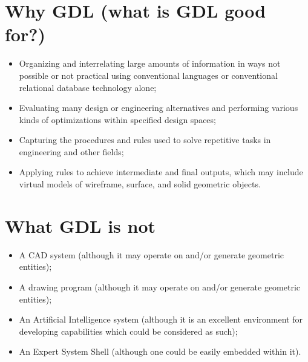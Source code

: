 \documentclass [11pt]{book}
\begin{document}
\section{Why GDL (what is GDL good for?)}

\label{sec:whygdl(whatisgdlgoodfor?)}



\begin{itemize}

\item Organizing and interrelating large amounts of information
in ways not possible or not practical using conventional languages or 
conventional relational database technology alone;

\item Evaluating many design or engineering alternatives and 
performing various kinds of optimizations within specified design
spaces;

\item Capturing the procedures and rules used to solve repetitive
tasks in engineering and other fields;

\item Applying rules to achieve intermediate and final 
outputs, which may include virtual models of wireframe, surface,
and solid geometric objects.

\end{itemize}



\section{What GDL is not}

\label{sec:whatgdlisnot}



\begin{itemize}

\item A CAD system (although it may operate on and/or generate geometric entities);

\item A drawing program (although it may operate on and/or generate geometric entities);

\item An Artificial Intelligence system (although it is an
excellent environment for developing capabilities which could be
considered as such);

\item An Expert System Shell (although one could be easily embedded within it).

\end{itemize}
\end{document}
